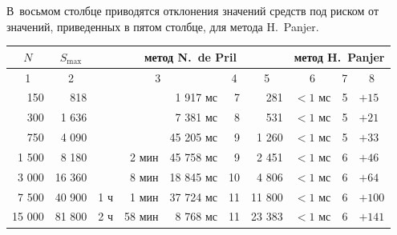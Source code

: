 В~восьмом столбце приводятся отклонения значений средств под риском от значений, приведенных в пятом столбце, для метода H.~Panjer.



\begin{table}[b!]

\centering

\small

\begin{tabular}{r|r|rrr|r|r|r|r|l}

\hline

\multicolumn{1}{c|}{\footnotesize $N$} &  

\multicolumn{1}{c|}{\footnotesize $S_{\max}$}  &

\multicolumn{5}{c|}{\footnotesize метод N.~de Pril} & 

\multicolumn{3}{c}{\footnotesize метод H.~Panjer}  \\

\hline

\multicolumn{1}{c|}{\footnotesize 1 } & \multicolumn{1}{c|}{\footnotesize 2}   & 

\multicolumn{3}{c|}{\footnotesize 3} & \multicolumn{1}{c|}{\footnotesize 4}   & 

\multicolumn{1}{c|}{\footnotesize 5} &  

\multicolumn{1}{c|}{\footnotesize 6} & 

\multicolumn{1}{c|}{\footnotesize 7} & 

\multicolumn{1}{c}{\footnotesize 8}  \\

\hline

\rule{0mm}{12pt}

  150  &    818   &      &        &  1 917 мс & 7  &   281     & $< 1$ мс  &  5 & $+ 15$       \\

  300  &  1 636   &      &        &  7 381 мс & 8  &   531     & $< 1$ мс  &  5 & $+ 21$   \\

  750  &  4 090   &      &        & 45 205 мс & 9  &  1 260    & $< 1$ мс  &  5 & $+ 33$    \\

1 500  &  8 180   &      &  2 мин & 45 758 мс & 9  &  2 451    & $< 1$ мс  &  6 & $+ 46$   \\

3 000  & 16 360   &      &  8 мин & 18 845 мс & 10 &  4 806    & $< 1$ мс  &  6 & $+ 64$   \\

7 500  & 40 900   & 1 ч  &  1 мин & 37 724 мс & 11 & 11 800    & $< 1$ мс  &  6 & $+ 100$   \\

15 000 & 81 800   & 2 ч  & 58 мин & 8 768 мс  & 11 & 23 383    & $< 1$ мс  &  6 & $+141$  \\

\hline

\end{tabular} 



\end{table}




